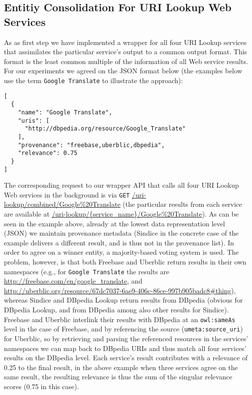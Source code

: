 \documentclass{acm_proc_article-sp}
\begin{document}
\subsection{Entitiy Consolidation For URI Lookup Web Services}\label{sec:consolidation1}
As as first step we have implemented a wrapper for all four URI Lookup services that assimilates the particular service's output to a common output format. This format is the least common multiple of the information of all Web service results. For our experiments we agreed on the JSON format below (the examples below use the term \texttt{Google Translate} to illustrate the approach):
\begin{verbatim}
[
  {
    "name": "Google Translate",
    "uris": [
      "http://dbpedia.org/resource/Google_Translate"
    ],
    "provenance": "freebase,uberblic,dbpedia",
    "relevance": 0.75
  }
]
\end{verbatim} 
The corresponding request to our wrapper API that calls all four URI Lookup Web services in the background is via \texttt{GET} \url{/uri-lookup/combined/Google%20Translate} (the particular results from each service are available at \url{/uri-lookup/{service_name}/Google%
\end{document}
